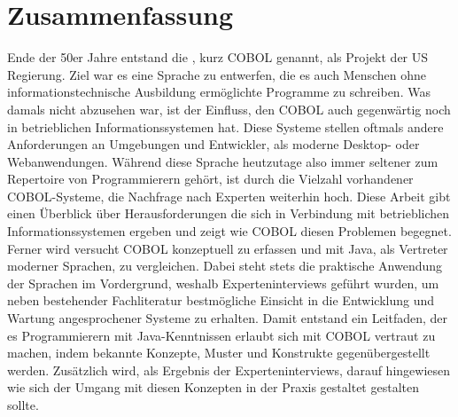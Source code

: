 \chapter*{Zusammenfassung} 

Ende der 50er Jahre entstand die , kurz COBOL genannt, als Projekt der US Regierung. Ziel war es eine Sprache zu entwerfen, die es auch Menschen ohne informationstechnische Ausbildung ermöglichte Programme zu schreiben. Was damals nicht abzusehen war, ist der Einfluss, den COBOL auch gegenwärtig noch in betrieblichen Informationssystemen hat. Diese Systeme stellen oftmals andere Anforderungen an Umgebungen und Entwickler, als moderne Desktop- oder Webanwendungen. Während diese Sprache heutzutage also immer seltener zum Repertoire von Programmierern gehört, ist durch die Vielzahl vorhandener COBOL-Systeme, die Nachfrage nach Experten weiterhin hoch. Diese Arbeit gibt einen Überblick über Herausforderungen die sich in Verbindung mit betrieblichen Informationssystemen ergeben und zeigt wie COBOL diesen Problemen begegnet. Ferner wird versucht COBOL konzeptuell zu erfassen und mit Java, als Vertreter moderner Sprachen, zu vergleichen. Dabei steht stets die praktische Anwendung der Sprachen im Vordergrund, weshalb Experteninterviews geführt wurden, um neben bestehender Fachliteratur bestmögliche Einsicht in die Entwicklung und Wartung angesprochener Systeme zu erhalten. Damit entstand ein Leitfaden, der es Programmierern mit Java-Kenntnissen erlaubt sich mit COBOL vertraut zu machen, indem bekannte Konzepte, Muster und Konstrukte gegenübergestellt werden. Zusätzlich wird, als Ergebnis der Experteninterviews, darauf hingewiesen wie sich der Umgang mit diesen Konzepten in der Praxis gestaltet \bzw gestalten sollte. 